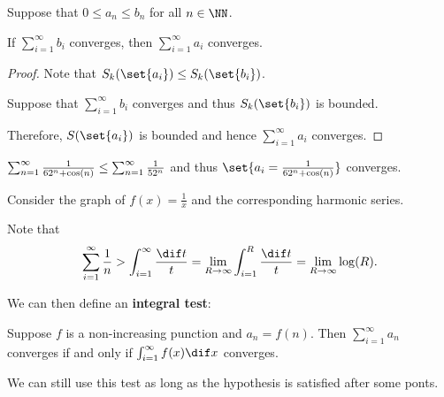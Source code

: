 \documentclass[11pt]{scrartcl}
\begin{document}
\begin{theorem}
Suppose that $0\leq a_n \leq b_n$ for all $n\in\NN$.

If $\sum_{i=1}^{\infty}b_i$ converges, then $\sum_{i=1}^{\infty}a_i$ converges.
\end{theorem}
\begin{proof}
  \hfill

  Note that $S_k(\set{a_i}) \leq S_k(\set{b_i})$. 

  Suppose that $\sum_{i=1}^{\infty}b_i$ converges and thus
  $S_k(\set{b_i})$ is bounded.

  Therefore, $S(\set{a_i})$ is bounded and hence
  $\sum_{i=1}^{\infty} a_i$ converges.
\end{proof}

\begin{example}

  $\sum_{n=1}^{\infty} \frac{1}{6\* 2^n + \cos (n)} \leq
  \sum_{n=1}^{\infty} \frac{1}{5\*2^n}$ and thus
  $\set{a_i = \frac{1}{6\* 2^n + \cos (n)}}$ converges.
\end{example}

Consider the graph of $f(x) = \frac{1}{x}$ and the corresponding harmonic series.

Note that
\[\sum_{i=1}^{\infty} \frac{1}{n} > \int_{i=1}^{\infty} \frac{\dif t}{t} = \lim_{R\to \infty}\int_{i=1}^R \frac{\dif t}{t} = \lim_{R\to \infty} \log (R).\]

We can then define an \textbf{integral test}:

\begin{definition}
\hfill

  Suppose $f$ is a non-increasing punction and $a_n = f(n)$. Then
  $\sum_{i=1}^{\infty}a_n$ converges if and only if
  $\int_{i=1}^{\infty} f(x) \dif x$ converges.
\end{definition}

We can still use this test as long as the hypothesis is satisfied after some ponts.
\end{document}

